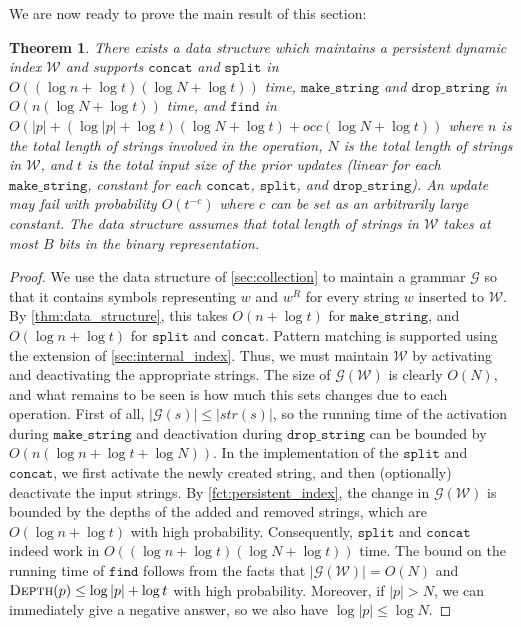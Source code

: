 \documentclass[a4paper]{article}
\newtheorem{theorem}{Theorem}[section]
\theoremstyle{remark}
\newcommand{\makeop}{\mathtt{make\_string}}
\newcommand{\dropop}{\mathtt{drop\_string}}
\newcommand{\concop}{\mathtt{concat}}
\newcommand{\splitop}{\mathtt{split}}
\newcommand{\findop}{\mathtt{find}}
\newcommand{\depth}{\textsc{Depth}}
\newcommand{\grammar}{\mathcal{G}}
\newcommand{\mword}{B}
\newcommand{\sstr}{\textit{str}}
\newcommand{\coll}{\mathcal{W}}
\begin{document}
We are now ready to prove the main result of this section:

\begin{theorem}\label{thm:persistent_index}
There exists a data structure which maintains a persistent dynamic index $\coll$ and supports $\concop$ and $\splitop$ in $O((\log n + \log t)(\log N + \log t))$
time, $\makeop$ and $\dropop$ in $O(n(\log N + \log t))$ time,
and $\findop$ in $O(|p|+(\log |p|+\log t)(\log N+\log t) + occ(\log N+\log t))$ where $n$ is the total length of strings involved in the operation,
$N$ is the total length of strings in $\coll$, and $t$ is the total input size of the prior updates (linear for each $\makeop$, constant for each $\concop$, $\splitop$, and $\dropop$).
An update may fail with probability $O(t^{-c})$ where $c$ can be set as an arbitrarily large constant.
The data structure assumes that total length of strings in $\coll$ takes at most $\mword$ bits in the binary representation.
\end{theorem}
\begin{proof}
We use the data structure of \cref{sec:collection} to maintain a grammar $\grammar$ so that it contains symbols representing $w$ and $w^R$ for every string
$w$ inserted to $\coll$. By \cref{thm:data_structure}, this takes $O(n+\log t)$ for $\makeop$, and $O(\log n + \log t)$ for $\splitop$ and $\concop$.
Pattern matching is supported using the extension of \cref{sec:internal_index}. Thus, we must maintain $\coll$ by activating
and deactivating the appropriate strings.
The size of $\grammar(\coll)$ is clearly $O(N)$, and what remains to be seen is how much this sets changes due to each operation.
First of all, $|\grammar(s)|\le |\sstr(s)|$, so the running time of the activation during $\makeop$ and deactivation during $\dropop$
can be bounded by $O(n(\log n + \log t + \log N))$. In the implementation of the $\splitop$ and $\concop$, we first activate the newly created string,
and then (optionally) deactivate the input strings. By \cref{fct:persistent_index}, the change in $\grammar(\coll)$ is bounded by the depths of the added and
removed strings, which are $O(\log n + \log t)$ with high probability. Consequently, $\splitop$ and $\concop$ indeed work in $O((\log n + \log t)(\log N + \log t))$ time. The bound on the running time of $\findop$ follows from the facts that $|\grammar(\coll)|=O(N)$ and $\depth(p)\le \log |p|+\log t$
with high probability. Moreover, if $|p|>N$, we can immediately give a negative answer, so we also have $\log |p|\le \log N$.
\end{proof}
\end{document}
